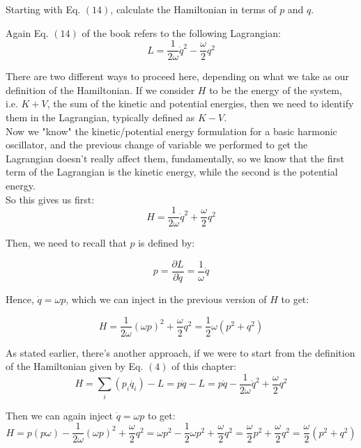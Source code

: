 \documentclass[solutions.tex]{subfiles}
\begin{document}
\maketitle
\begin{exercise}
Starting with Eq. $(14)$, calculate the Hamiltonian in terms of $p$
and $q$.
\end{exercise}

Again Eq. $(14)$ of the book refers to the following Lagrangian:
\[
	L = \frac{1}{2\omega}\dot{q}^2 - \frac{\omega}{2}q^2
\]

There are two different ways to proceed here, depending on
what we take as our definition of the Hamiltonian. If we
consider $H$ to be the energy of the system, i.e. $K+V$,
the sum of the kinetic and potential energies, then we need
to identify them in the Lagrangian, typically defined as $K-V$. \\

Now we "know" the kinetic/potential energy formulation for
a basic harmonic oscillator, and the previous change of variable
we performed to get the Lagrangian doesn't really affect them,
fundamentally, so we know that the first term of the Lagrangian
is the kinetic energy, while the second is the potential energy. \\

So this gives us first:
\[
	H = \frac{1}{2\omega}\dot{q}^2 + \frac{\omega}{2}q^2
\]

Then, we need to recall that $p$ is defined by:

\[
	p = \frac{\partial L}{\partial\dot{q}} = \frac{1}\omega\dot{q}
\]

Hence, $\dot{q} = \omega p$, which we can inject in the previous
version of $H$ to get:

\[
	H = \frac{1}{2\omega}(\omega p)^2 + \frac{\omega}{2}q^2
		= \boxed{\frac12\omega(p^2+q^2)}
\]

As stated earlier, there's another approach, if we were to start
from the definition of the Hamiltonian given by Eq. $(4)$ of this chapter:
\[
	H = \sum_i (p_i \dot{q_i})-L = p\dot{q}-L
		= p\dot{q}-\frac{1}{2\omega}\dot{q}^2 + \frac{\omega}{2}q^2
\]

Then we can again inject $\dot{q} = \omega p$ to get:
\[
	H = p (p \omega) - \frac{1}{2\omega}(\omega p)^2+\frac\omega2q^2
		= \omega p^2 - \frac12\omega p^2+\frac\omega2q^2
		= \frac\omega2 p^2 + \frac\omega2q^2 = \boxed{\frac\omega2(p^2+q^2)}
\]
\end{document}
